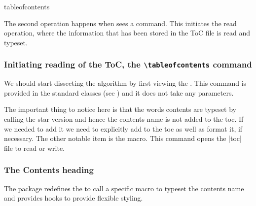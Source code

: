 \begin{docCommand}{tableofcontents}{}{}


\end{docCommand}

The second operation happens when \latexe sees a  command. This initiates the read operation, where the information that has been stored in the ToC file is read and typeset.

\subsubsection{Initiating reading of the ToC, the \texttt{\textbackslash tableofcontents} command}

We should start dissecting the algorithm by first viewing the . This command is provided in
the standard classes (see \pageref{tableofcontents}) and it does not take any parameters.

\begin{teXXX}
\setcounter{tocdepth}{2}
\newcommand\tableofcontents{%
    \if@twocolumn
      \@restonecoltrue\onecolumn
    \else
      \@restonecolfalse
    \fi
    \chapter*{\contentsname
        \@mkboth{%
           \MakeUppercase\contentsname}{\MakeUppercase\contentsname}}%
          \@starttoc{toc} (*@\label{starttoc}@*)
    \if@restonecol\twocolumn\fi
    }
\end{teXXX}


The important thing to notice here is that the words contents are typeset by calling the star version and hence the contents name is not added to the toc. If we needed to add it we need to explicitly add to the toc as well as format it, if necessary. The other notable item is the  macro. This command opens the |toc| file to read or write.

\subsubsection{The Contents heading}
 
 The   package redefines the \cmd{\tableofcontents}  to call a specific macro to typeset
 the contents name and provides hooks to provide flexible styling. 
              
